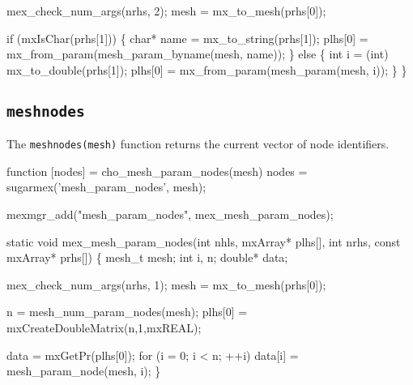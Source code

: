     mex_check_num_args(nrhs, 2);
    mesh = mx_to_mesh(prhs[0]);

    if (mxIsChar(prhs[1])) \{
        char* name = mx_to_string(prhs[1]);
        plhs[0] = mx_from_param(mesh_param_byname(mesh, name));
    \} else \{
        int i = (int) mx_to_double(prhs[1]);
        plhs[0] = mx_from_param(mesh_param(mesh, i));
    \}
\}

\nwendcode{}\nwdocspar


\subsection{{\tt{}mesh{}nodes}}

The {\tt{}mesh{}nodes(mesh)} function returns the current vector of node
identifiers.

\nwenddocs{}\endmoddef
function [nodes] = cho_mesh_param_nodes(mesh)
nodes = sugarmex('mesh_param_nodes', mesh);
\nwendcode{}\nwdocspar

\nwenddocs{}\plusendmoddef
mexmgr_add("mesh_param_nodes", mex_mesh_param_nodes);
\nwendcode{}\nwdocspar

\nwenddocs{}\plusendmoddef
static void mex_mesh_param_nodes(int nhls, mxArray* plhs[],
                                 int nrhs, const mxArray* prhs[])
\{
    mesh_t mesh;
    int i, n;
    double* data;

    mex_check_num_args(nrhs, 1);    
    mesh = mx_to_mesh(prhs[0]);

    n = mesh_num_param_nodes(mesh);
    plhs[0] = mxCreateDoubleMatrix(n,1,mxREAL);

    data = mxGetPr(plhs[0]);
    for (i = 0; i < n; ++i)
        data[i] = mesh_param_node(mesh, i);
\}

\nwendcode{}

